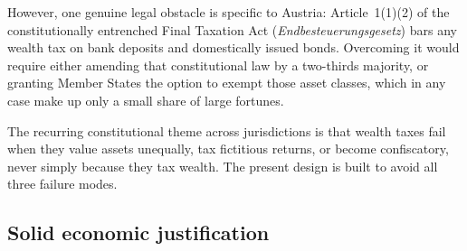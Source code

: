 \documentclass[../../main]{subfiles}
\begin{document}
However, one genuine legal obstacle is specific to Austria: Article~1(1)(2) of the constitutionally entrenched Final Taxation Act (\emph{Endbesteuerungsgesetz}) bars any wealth tax on bank deposits and domestically issued bonds. Overcoming it would require either amending that constitutional law by a two-thirds majority, or granting Member States the option to exempt those asset classes, which in any case make up only a small share of large fortunes. %


The recurring constitutional theme across jurisdictions is that wealth taxes fail when they value assets unequally, tax fictitious returns, or become confiscatory, never simply because they tax wealth. The present design is built to avoid all three failure modes.

\subsection{Solid economic justification}
\end{document}
